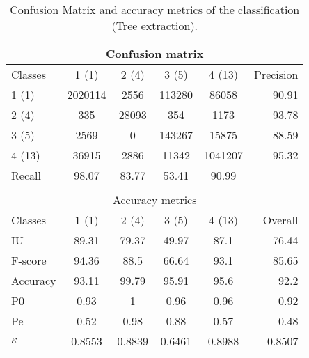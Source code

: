 \begin{table}[H]
\begin{center}
\footnotesize
\begin{tabular}{|l|c|c|c|c|r|}
\hline
\multicolumn{6}{|c|}{Confusion matrix} \\
\hline
 Classes & 1 (1) & 2 (4) & 3 (5) & 4 (13) & Precision \\
\hline
1 (1) & 2020114 & 2556 & 113280 & 86058 & 90.91 \\
\hline
2 (4) & 335 & 28093 & 354 & 1173 & 93.78 \\
\hline
3 (5) & 2569 & 0 & 143267 & 15875 & 88.59 \\
\hline
4 (13) & 36915 & 2886 & 11342 & 1041207 & 95.32 \\
\hline
Recall & 98.07 & 83.77 & 53.41 & 90.99 &  \\
\hline
\multicolumn{6}{c}{ } \\
\hline
\multicolumn{6}{|c|}{Accuracy metrics} \\
\hline
 Classes & 1 (1) & 2 (4) & 3 (5) & 4 (13) & Overall \\
\hline
IU & 89.31 & 79.37 & 49.97 & 87.1 & 76.44 \\
\hline
F-score & 94.36 & 88.5 & 66.64 & 93.1 & 85.65 \\
\hline
Accuracy & 93.11 & 99.79 & 95.91 & 95.6 & 92.2 \\
\hline
P0 & 0.93 & 1 & 0.96 & 0.96 & 0.92 \\
\hline
Pe & 0.52 & 0.98 & 0.88 & 0.57 & 0.48 \\
\hline
$\kappa$ & 0.8553 & 0.8839 & 0.6461 & 0.8988 & 0.8507 \\
\hline
\end{tabular}
\caption{Confusion Matrix and accuracy metrics of the classification (Tree extraction).}
\label{table:}
\end{center}
\end{table}
